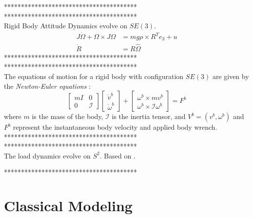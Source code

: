 ***************************************\\

***************************************\\
Rigid Body Attitude Dynamics evolve on $ SE(3) $.
\begin{align}\label{eq:eomrigidbody}
J\dot{\Omega}+\Omega\times J\Omega &= mg\rho\times R^Te_3+u\\ 
\dot{R} &= R\hat{\Omega}
\end{align}
***************************************\\


***************************************\\
The equations of motion for a rigid body with configuration $ SE(3) $ are given by the \textit{Newton-Euler equations} \cite{Murray1994}:
\begin{equation}\label{key}
\begin{bmatrix}
	mI&0\\
	0&\mathcal{I}
\end{bmatrix}
\begin{bmatrix}
	\dot{v}^b\\
	\dot{\omega}^b
\end{bmatrix}+
\begin{bmatrix}
	\omega^b\times mv^b\\
	\omega^b\times\mathcal{I}\omega^b
\end{bmatrix}=F^b
\end{equation}
where $ m $ is the mass of the body, $ \mathcal{I} $ is the inertia tensor, and $ V^b=(v^b,\omega^b) $ and $ F^b $ represent the instantaneous body velocity and applied body wrench.
***************************************\\


***************************************\\
The load dynamics evolve on $S^2 $.
Based on \cite{Lee2011}.

***************************************\\


\section{Classical Modeling}


